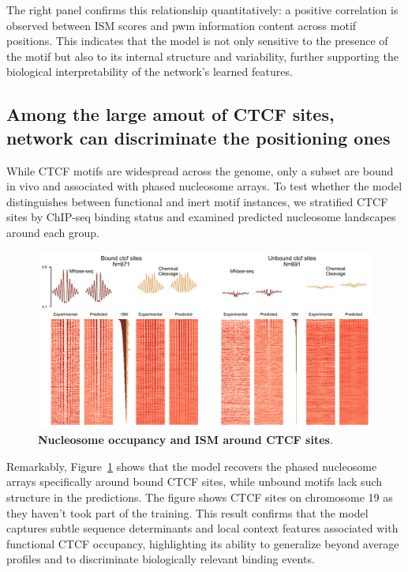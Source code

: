 \documentclass[11pt]{book}
\begin{document}
The right panel confirms this relationship quantitatively: a positive correlation is observed between ISM scores and \gls{pwm} information content across motif positions. This indicates that the model is not only sensitive to the presence of the motif but also to its internal structure and variability, further supporting the biological interpretability of the network’s learned features.


\subsection{Among the large amout of CTCF sites, network can discriminate the positioning ones}
While CTCF motifs are widespread across the genome, only a subset are bound in vivo and associated with phased nucleosome arrays. To test whether the model distinguishes between functional and inert motif instances, we stratified CTCF sites by ChIP-seq binding status \cite{festuccia_transcription_2019} and examined predicted nucleosome landscapes around each group.

\begin{figure}[htbp]
    \centering
    \includegraphics[width=\textwidth]{Figures/Results/chr19_CTCF_MNASECHEM_sites_heatmap_metaplot.pdf}
    \caption{\textbf{Nucleosome occupancy and ISM around CTCF sites}.}

    \label{fig:nuc_on_ctcf_site}
\end{figure}

Remarkably, Figure~\ref{fig:nuc_on_ctcf_site} shows that the model recovers the phased nucleosome arrays specifically around bound CTCF sites, while unbound motifs lack such structure in the predictions. The figure shows CTCF sites on chromosome 19 as they haven't took part of the training. This result confirms that the model captures subtle sequence determinants and local context features associated with functional CTCF occupancy, highlighting its ability to generalize beyond average profiles and to discriminate biologically relevant binding events.
\end{document}
